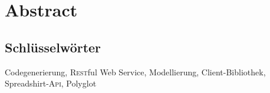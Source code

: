 \chapter*{Abstract}



\section*{Schlüsselwörter}

Codegenerierung, \textsc{Rest}ful Web Service, Modellierung, Client-Bibliothek, Spreadshirt-\textsc{Api}, Polyglot
\newpage